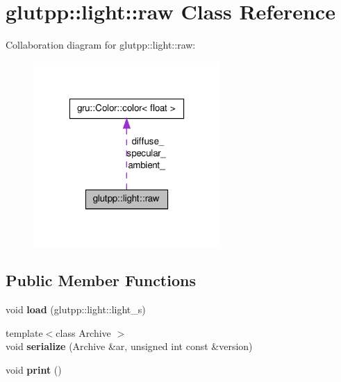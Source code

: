 \hypertarget{classglutpp_1_1light_1_1raw}{\section{glutpp\-:\-:light\-:\-:raw \-Class \-Reference}
\label{classglutpp_1_1light_1_1raw}
}


\-Collaboration diagram for glutpp\-:\-:light\-:\-:raw\-:
\nopagebreak
\begin{figure}[H]
\begin{center}
\leavevmode
\includegraphics[width=202pt]{classglutpp_1_1light_1_1raw__coll__graph}
\end{center}
\end{figure}
\subsection*{\-Public \-Member \-Functions}
\begin{DoxyCompactItemize}
\item 
\hypertarget{classglutpp_1_1light_1_1raw_a6162f0f546b1b04b07757456dd5649b0}{void {\bfseries load} (glutpp\-::light\-::light\-\_\-s)}\label{classglutpp_1_1light_1_1raw_a6162f0f546b1b04b07757456dd5649b0}

\item 
\hypertarget{classglutpp_1_1light_1_1raw_afc814b37f0c86ce19d5c7f468bcf4cd1}{{\footnotesize template$<$class Archive $>$ }\\void {\bfseries serialize} (\-Archive \&ar, unsigned int const \&version)}\label{classglutpp_1_1light_1_1raw_afc814b37f0c86ce19d5c7f468bcf4cd1}

\item 
\hypertarget{classglutpp_1_1light_1_1raw_a9818fe2fc9498110fa26b408a15df2e7}{void {\bfseries print} ()}\label{classglutpp_1_1light_1_1raw_a9818fe2fc9498110fa26b408a15df2e7}

\end{DoxyCompactItemize}
